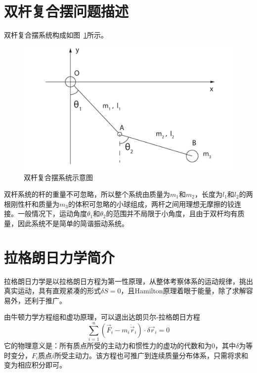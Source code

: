 \documentclass[a4paper,12pt,titlepage]{article}
\begin{document}
\section{双杆复合摆问题描述} %
\label{sec:Discription_}
双杆复合摆系统构成如图~\ref{fig:system}所示。
\begin{figure}[htpb]
\centering
\includegraphics[width=\textwidth]{./system.pdf}
\caption[Caption for LOF]{双杆复合摆系统示意图}
\label{fig:system}
\end{figure}
双杆系统的杆的重量不可忽略，所以整个系统由质量为$m_1$和$m_2$，长度为$l_1$和$l_2$的两根刚性杆和质量为$m_3$的体积可忽略的小球组成，两杆之间用理想无摩擦的铰连接。一般情况下，运动角度$\theta_1$和$\theta_2$的范围并不局限于小角度，且由于双杆均有质量，因此系统不是简单的简谐振动系统。



\section{拉格朗日力学简介} %
\label{sec:Lagrange Mechanics}
拉格朗日力学是以拉格朗日方程为第一性原理，从整体考察体系的运动规律，挑出真实运动，具有直观紧凑的形式$\delta S=0$，且Hamilton原理着眼于能量，除了求解容易外，还利于推广。

由牛顿力学方程组和虚功原理，可以退出达朗贝尔-拉格朗日方程
\begin{equation}
\label{eq:dle}
	\sum_{i=1}^n \left(\vec{F}_i-m_i\ddot{\vec{r}}_i\right)\cdot \delta\vec{r}_i=0
\end{equation}
它的物理意义是：所有质点所受的主动力和惯性力的虚功的代数和为0，其中$\delta$为等时变分，$F_i$质点$i$所受主动力。该方程也可推广到连续质量分布体系，只需将求和变为相应积分即可。
\end{document}
